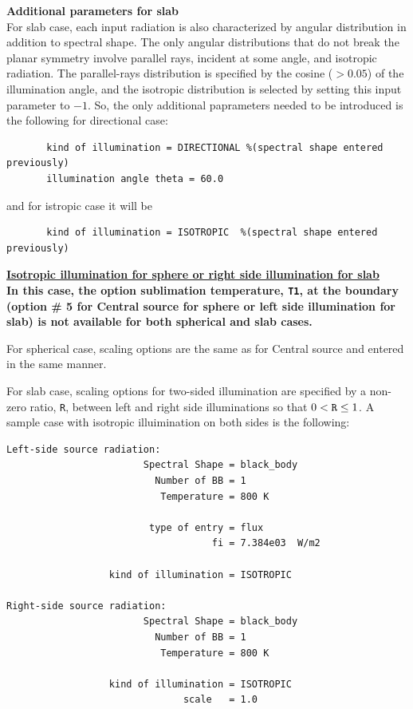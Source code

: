 \documentclass[11pt]{article}
\begin{document}
\newpage

{\bf Additional parameters for slab}\\

For slab case, each input radiation is also characterized by angular
distribution in addition to spectral shape. The only angular distributions that
do not break the planar symmetry involve parallel rays, incident at some angle,
and isotropic radiation. The parallel-rays distribution is specified by the
cosine ($> 0.05$) of the illumination angle, and the isotropic distribution is
selected by setting this input parameter to $-1$. So, the only additional
paprameters needed to be introduced is the following for directional case:
\begin{verbatim}
       kind of illumination = DIRECTIONAL %(spectral shape entered previously)
       illumination angle theta = 60.0
\end{verbatim}
and for istropic case it will be
\begin{verbatim}
       kind of illumination = ISOTROPIC  %(spectral shape entered previously)
\end{verbatim}


{\bf\underline{Isotropic illumination for sphere or right side illumination for slab}}\\

{\bf In this case, the option sublimation temperature, {\tt T1}, at the
boundary (option \# 5 for Central source for sphere or left side illumination
for slab) is not available for both spherical and slab cases.}

For spherical case, scaling options are the same as for Central source and
entered in the same manner.

For slab case, scaling options for two-sided illumination are specified by a
non-zero ratio, {\tt R}, between left and right side illuminations so that  $0
< {\tt R} \le 1$. A sample case with isotropic illuimination on both sides is
the following:
\begin{verbatim}
Left-side source radiation:
                        Spectral Shape = black_body
                          Number of BB = 1
                           Temperature = 800 K

                         type of entry = flux
                                    fi = 7.384e03  W/m2

                  kind of illumination = ISOTROPIC

Right-side source radiation:
                        Spectral Shape = black_body
                          Number of BB = 1
                           Temperature = 800 K

                  kind of illumination = ISOTROPIC
                               scale   = 1.0
\end{verbatim}
\end{document}
